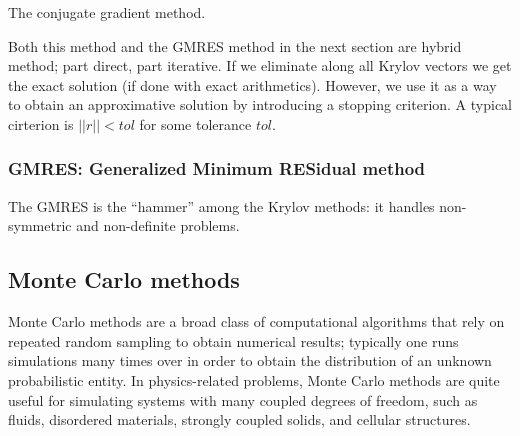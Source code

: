 \begin{algorithm}[H]
  \caption{The conjugate gradient method.}
\end{algorithm}

Both this method and the GMRES method in the next section are hybrid method; part direct, part iterative. If we eliminate along all Krylov vectors we get the exact solution (if done with exact arithmetics). However, we use it as a way to obtain an approximative solution by introducing a stopping criterion. A typical cirterion is $\vert\vert r \vert\vert < tol$ for some tolerance $tol$.













\subsubsection{GMRES: Generalized Minimum RESidual method} %
\label{ssub:gmres_generalized_minimum_residual_method}
The GMRES is the ``hammer'' among the Krylov methods: it handles non-symmetric and non-definite problems.



\subsection{Monte Carlo methods} %
\label{sub:monte_carlo_methods}
Monte Carlo methods are a broad class of computational algorithms that rely on repeated random sampling to obtain numerical results; typically one runs simulations many times over in order to obtain the distribution of an unknown probabilistic entity. In physics-related problems, Monte Carlo methods are quite useful for simulating systems with many coupled degrees of freedom, such as fluids, disordered materials, strongly coupled solids, and cellular structures.

